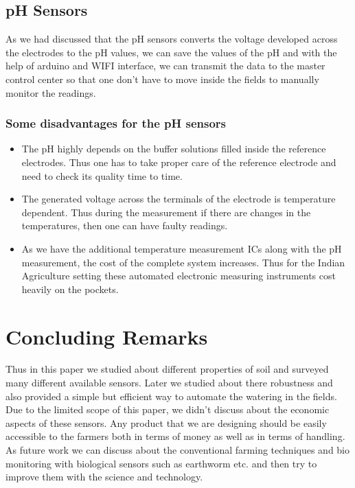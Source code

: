 \documentclass[11pt]{article}
\begin{document}
\subsection{pH Sensors}
As we had discussed that the pH sensors converts the voltage developed across the electrodes to the pH values, we can save the values of the pH and with the help of arduino and WIFI interface, we can transmit the data to the master control center so that one don't have to move inside the fields to manually monitor the readings.

\subsubsection{Some disadvantages for the pH sensors}
\begin{itemize}
    \item The pH highly depends on the buffer solutions filled inside the reference electrodes. Thus one has to take proper care of the reference electrode and need to check its quality time to time.
    \item The generated voltage across the terminals of the electrode is temperature dependent. Thus during the measurement if there are changes in the temperatures, then one can have faulty readings. 
    \item As we have the additional temperature measurement ICs along with the pH measurement, the cost of the complete system increases. Thus for the Indian Agriculture setting these automated electronic measuring instruments cost heavily on the pockets.
\end{itemize}
\section{Concluding Remarks}
Thus in this paper we studied about different properties of soil and surveyed many different available sensors. Later we studied about there robustness and also provided a simple but efficient way to automate the watering in the fields. Due to the limited scope of this paper, we didn't discuss about the economic aspects of these sensors. Any product that we are designing should be easily accessible to the farmers both in terms of money as well as in terms of handling. As future work we can discuss about the conventional farming techniques and bio monitoring with biological sensors such as earthworm etc. and then try to improve them with the science and technology.
\end{document}
